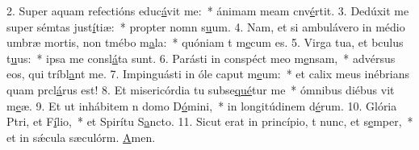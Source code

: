 2. Super aquam refectións educ\uline{á}vit me:~* ánimam meam cnv\uline{é}rtit.
3. Dedúxit me super sémtas just\uline{í}tiæ:~* propter nomn s\uline{u}um.
4. Nam, et si ambulávero in médio umbræ mortis, non tmébo m\uline{a}la:~* quóniam t m\uline{e}cum es.
5. Virga tua, et bculus t\uline{u}us:~* ipsa me consl\uline{á}ta sunt.
6. Parásti in conspéct meo m\uline{e}nsam,~* advérsus eos, qui tríbl\uline{a}nt me.
7. Impinguásti in óle caput m\uline{e}um:~* et calix meus inébrians quam prcl\uline{á}rus est!
8. Et misericórdia tu subse\uline{qué}tur me~* ómnibus diébus vit m\uline{e}æ.
9. Et ut inhábitem n domo D\uline{ó}mini,~* in longitúdinem d\uline{é}rum.
10. Glória Ptri, et F\uline{í}lio,~* et Spirítu S\uline{a}ncto.
11. Sicut erat in princípio, t nunc, et s\uline{e}mper,~* et in sǽcula sæculórm. \uline{A}men.
